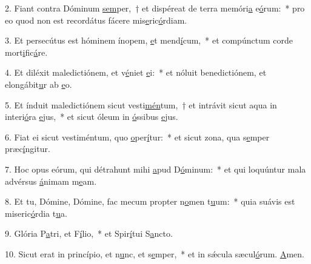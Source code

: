 2. Fiant contra Dóminum \uline{sem}per,~† et dispéreat de terra memóri\uline{a} e\uline{ó}rum:~* pro eo quod non est recordátus fácere mis\uline{e}ric\uline{ó}rdiam.\par 
3. Et persecútus est hóminem ínopem, \uline{e}t mend\uline{í}cum,~* et compúnctum corde mort\uline{i}fic\uline{á}re.\par 
4. Et diléxit maledictiónem, et v\uline{é}niet \uline{e}i:~* et nóluit benedictiónem, et elongábit\uline{u}r ab \uline{e}o.\par 
5. Et índuit maledictiónem sicut vesti\uline{mén}tum,~† et intrávit sicut aqua in interi\uline{ó}ra \uline{e}jus,~* et sicut óleum in \uline{ó}ssibus \uline{e}jus.\par 
6. Fiat ei sicut vestiméntum, quo \uline{o}per\uline{í}tur:~* et sicut zona, qua s\uline{e}mper præc\uline{í}ngitur.\par 
7. Hoc opus eórum, qui détrahunt mihi \uline{a}pud D\uline{ó}minum:~* et qui loquúntur mala advérsus \uline{á}nimam m\uline{e}am.\par 
8. Et tu, Dómine, Dómine, fac mecum propter n\uline{o}men t\uline{u}um:~* quia suávis est miseric\uline{ó}rdia t\uline{u}a.\par 
9. Glória P\uline{a}tri, et F\uline{í}lio,~* et Spir\uline{í}tui S\uline{a}ncto.\par 
10. Sicut erat in princípio, et n\uline{u}nc, et s\uline{e}mper,~* et in sǽcula sæcul\uline{ó}rum. \uline{A}men.\par 
